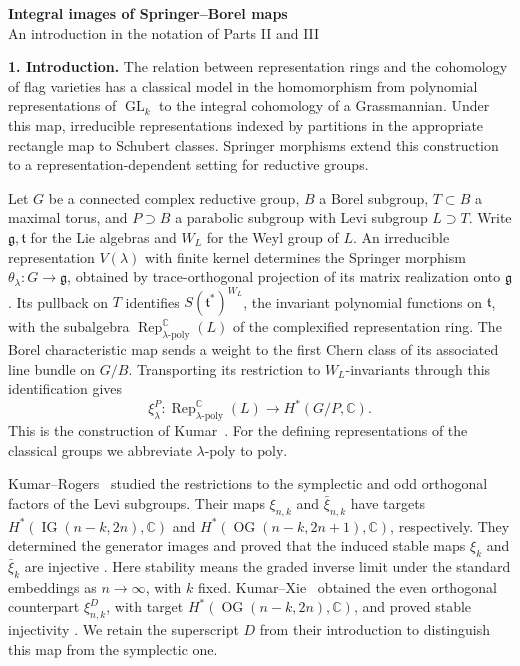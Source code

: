 \documentclass[11pt,letterpaper]{article}
\newcommand{\C}{\mathbb C}
\newcommand{\Rep}{\operatorname{Rep}}
\newcommand{\OG}{\operatorname{OG}}
\newcommand{\IG}{\operatorname{IG}}
\newcommand{\GL}{\operatorname{GL}}
\newcommand{\poly}{\mathrm{poly}}
\begin{document}
\begin{center}
{\Large\bfseries Integral images of Springer--Borel maps}\\[3pt]
{\small An introduction in the notation of Parts II and III}
\end{center}
\vspace{-3pt}
\noindent\textbf{1. Introduction.}
The relation between representation rings and the cohomology of flag varieties
has a classical model in the homomorphism from polynomial representations of
\(\GL_k\) to the integral cohomology of a Grassmannian. Under this map,
irreducible representations indexed by partitions in the appropriate rectangle
map to Schubert classes. Springer morphisms extend this construction to a
representation-dependent setting for reductive groups.

Let \(G\) be a connected complex reductive group, \(B\) a Borel subgroup,
\(T\subset B\) a maximal torus, and \(P\supset B\) a parabolic subgroup with Levi
subgroup \(L\supset T\). Write \(\mathfrak g,\mathfrak t\) for the Lie algebras
and \(W_L\) for the Weyl group of \(L\).
An irreducible representation \(V(\lambda)\) with finite kernel determines
the Springer morphism \(\theta_\lambda:G\to\mathfrak g\), obtained by
trace-orthogonal projection of its matrix realization onto \(\mathfrak g\).
Its pullback on \(T\) identifies \(S(\mathfrak t^*)^{W_L}\), the invariant
polynomial functions on \(\mathfrak t\), with the subalgebra
\(\Rep^{\C}_{\lambda\text{-}\poly}(L)\) of the complexified representation ring.
The Borel characteristic map sends a weight to the first Chern class of its
associated line bundle on \(G/B\). Transporting its restriction to
\(W_L\)-invariants through this identification gives
\[
 \xi^P_\lambda:\Rep^{\C}_{\lambda\text{-}\poly}(L)
       \longrightarrow H^*(G/P,\C).
\]
This is the construction of Kumar~\cite{K}. For the defining representations
of the classical groups we abbreviate \(\lambda\text{-}\poly\) to \(\poly\).

Kumar--Rogers~\cite{KR} studied the restrictions to the symplectic and odd
orthogonal factors of the Levi subgroups. Their maps
\(\xi_{n,k}\) and \(\bar\xi_{n,k}\) have targets
\(H^*(\IG(n-k,2n),\C)\) and \(H^*(\OG(n-k,2n+1),\C)\), respectively.
They determined the generator images and proved that the induced stable
maps \(\xi_k\) and \(\bar\xi_k\) are injective
\cite[Theorems 16 and 29]{KR}. Here stability means the graded inverse
limit under the standard embeddings as \(n\to\infty\), with \(k\) fixed.
Kumar--Xie~\cite{KX} obtained the even orthogonal counterpart
\(\xi^D_{n,k}\), with target \(H^*(\OG(n-k,2n),\C)\), and proved stable
injectivity \cite[Theorem 3.8]{KX}. We retain the superscript \(D\) from
their introduction to distinguish this map from the symplectic one.
\end{document}
